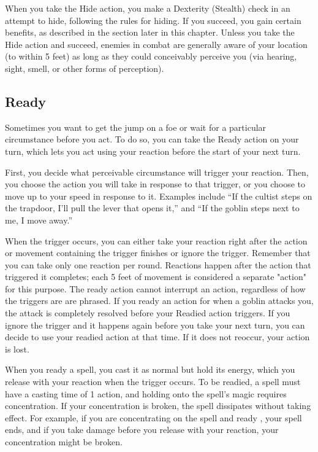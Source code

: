 When you take the Hide action, you make a Dexterity (Stealth) check in an attempt to hide, following the rules for hiding. If you succeed, you gain certain benefits, as described in the  section later in this chapter. Unless you take the Hide action and succeed, enemies in combat are generally aware of your location (to within 5 feet) as long as they could conceivably perceive you (via hearing, sight, smell, or other forms of perception).

\subsection{Ready}

Sometimes you want to get the jump on a foe or wait for a particular circumstance before you act. To do so, you can take the Ready action on your turn, which lets you act using your reaction before the start of your next turn.

First, you decide what perceivable circumstance will trigger your reaction. Then, you choose the action you will take in response to that trigger, or you choose to move up to your speed in response to it. Examples include “If the cultist steps on the trapdoor, I'll pull the lever that opens it,” and “If the goblin steps next to me, I move away.”

When the trigger occurs, you can either take your reaction right after the action or movement containing the trigger finishes or ignore the trigger. Remember that you can take only one reaction per round. Reactions happen after the action that triggered it completes; each 5 feet of movement is considered a separate "action" for this purpose. The ready action cannot interrupt an action, regardless of how the triggers are are phrased. If you ready an action for when a goblin attacks you, the attack is completely resolved before your Readied action triggers. If you ignore the trigger and it happens again before you take your next turn, you can decide to use your readied action at that time. If it does not reoccur, your action is lost.

When you ready a spell, you cast it as normal but hold its energy, which you release with your reaction when the trigger occurs. To be readied, a spell must have a casting time of 1 action, and holding onto the spell's magic requires concentration. If your concentration is broken, the spell dissipates without taking effect. For example, if you are concentrating on the  spell and ready , your  spell ends, and if you take damage before you release  with your reaction, your concentration might be broken.

